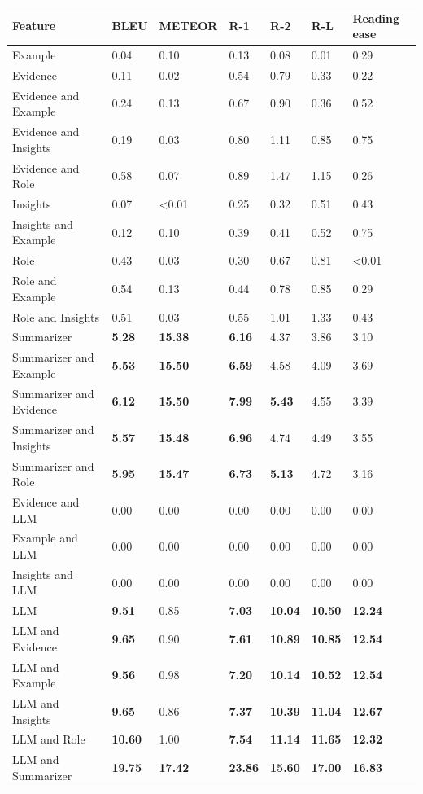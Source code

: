 \begin{tabular}{|l|l|l|l|l|l|l|}
\hline
\textbf{Feature} & BLEU & METEOR & R-1 & R-2 & R-L & Reading ease \\
 \hline
 Example & 0.04 & 0.10 & 0.13 & 0.08 & 0.01 & 0.29 \\
 \hline
 Evidence & 0.11 & 0.02 & 0.54 & 0.79 & 0.33 & 0.22 \\
 \hline
 Evidence and Example & 0.24 & 0.13 & 0.67 & 0.90 & 0.36 & 0.52 \\
 \hline
 Evidence and Insights & 0.19 & 0.03 & 0.80 & 1.11 & 0.85 & 0.75 \\
 \hline
 Evidence and Role & 0.58 & 0.07 & 0.89 & 1.47 & 1.15 & 0.26 \\
 \hline
 Insights & 0.07 & \textless{}0.01 & 0.25 & 0.32 & 0.51 & 0.43 \\
 \hline
 Insights and Example & 0.12 & 0.10 & 0.39 & 0.41 & 0.52 & 0.75 \\
 \hline
 Role & 0.43 & 0.03 & 0.30 & 0.67 & 0.81 & \textless{}0.01 \\
 \hline
 Role and Example & 0.54 & 0.13 & 0.44 & 0.78 & 0.85 & 0.29 \\
 \hline
 Role and Insights & 0.51 & 0.03 & 0.55 & 1.01 & 1.33 & 0.43 \\
 \hline
 Summarizer & \textbf{5.28} & \textbf{15.38} & \textbf{6.16} & 4.37 & 3.86 & 3.10 \\
 \hline
 Summarizer and Example & \textbf{5.53} & \textbf{15.50} & \textbf{6.59} & 4.58 & 4.09 & 3.69 \\
 \hline
 Summarizer and Evidence & \textbf{6.12} & \textbf{15.50} & \textbf{7.99} & \textbf{5.43} & 4.55 & 3.39 \\
 \hline
 Summarizer and Insights & \textbf{5.57} & \textbf{15.48} & \textbf{6.96} & 4.74 & 4.49 & 3.55 \\
 \hline
 Summarizer and Role & \textbf{5.95} & \textbf{15.47} & \textbf{6.73} & \textbf{5.13} & 4.72 & 3.16 \\
 \hline
 Evidence and LLM & 0.00 & 0.00 & 0.00 & 0.00 & 0.00 & 0.00 \\
 \hline
 Example and LLM & 0.00 & 0.00 & 0.00 & 0.00 & 0.00 & 0.00 \\
 \hline
 Insights and LLM & 0.00 & 0.00 & 0.00 & 0.00 & 0.00 & 0.00 \\
 \hline
 LLM & \textbf{9.51} & 0.85 & \textbf{7.03} & \textbf{10.04} & \textbf{10.50} & \textbf{12.24} \\
 \hline
 LLM and Evidence & \textbf{9.65} & 0.90 & \textbf{7.61} & \textbf{10.89} & \textbf{10.85} & \textbf{12.54} \\
 \hline
 LLM and Example & \textbf{9.56} & 0.98 & \textbf{7.20} & \textbf{10.14} & \textbf{10.52} & \textbf{12.54} \\
 \hline
 LLM and Insights & \textbf{9.65} & 0.86 & \textbf{7.37} & \textbf{10.39} & \textbf{11.04} & \textbf{12.67} \\
 \hline
 LLM and Role & \textbf{10.60} & 1.00 & \textbf{7.54} & \textbf{11.14} & \textbf{11.65} & \textbf{12.32} \\
 \hline
 LLM and Summarizer & \textbf{19.75} & \textbf{17.42} & \textbf{23.86} & \textbf{15.60} & \textbf{17.00} & \textbf{16.83} \\
\hline
\end{tabular}
